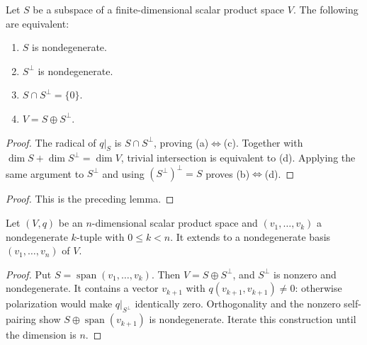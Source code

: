 \begin{lemma}\label{lem:nondegenerate-subspace}





Let $S$ be a subspace of a finite-dimensional scalar product space $V$. The
following are equivalent:
\begin{enumerate}[label=(\alph*)]
\item $S$ is nondegenerate.
\item $S^\perp$ is nondegenerate.
\item $S\cap S^\perp=\{0\}$.
\item $V=S\oplus S^\perp$.
\end{enumerate}
\end{lemma}

\begin{proof}

\sketch The radical of $q|_S$ is $S\cap S^\perp$, proving (a)$\Leftrightarrow$(c).
Together with $\dim S+\dim S^\perp=\dim V$, trivial intersection is equivalent to
(d). Applying the same argument to $S^\perp$ and using
$(S^\perp)^\perp=S$ proves (b)$\Leftrightarrow$(d).
\end{proof}

\begin{proof}

\sketch This is the preceding lemma.
\end{proof}

\begin{lemma}\label{lem:completion-nondegenerate-bases}





Let $(V,q)$ be an $n$-dimensional scalar product space and
$(v_1,\ldots,v_k)$ a nondegenerate $k$-tuple with $0\leq k<n$. It extends to a
nondegenerate basis $(v_1,\ldots,v_n)$ of $V$.
\end{lemma}

\begin{proof}


\sketch Put $S=\operatorname{span}(v_1,\ldots,v_k)$. Then
$V=S\oplus S^\perp$, and $S^\perp$ is nonzero and nondegenerate. It contains a
vector $v_{k+1}$ with $q(v_{k+1},v_{k+1})\ne0$: otherwise polarization would make
$q|_{S^\perp}$ identically zero. Orthogonality and the nonzero self-pairing show
$S\oplus\operatorname{span}(v_{k+1})$ is nondegenerate. Iterate this construction
until the dimension is $n$.
\end{proof}

